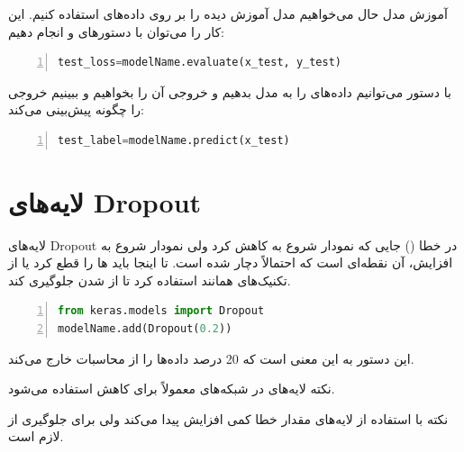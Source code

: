 \documentclass[10pt,xcolor=dvipsnames,professionalfont]{beamer}
\begin{document}
\begin{frame}[fragile]{آموزش مدل}
حال می‌خواهیم مدل آموزش دیده را بر روی داده‌های  استفاده کنیم. این کار را می‌توان با دستورهای  و  انجام دهیم:
\begin{latin}
\begin{lstlisting}[language=Python,frame=single,rulecolor=\color{magenta},numbers=left,numberstyle=\tiny]
test_loss=modelName.evaluate(x_test, y_test)
\end{lstlisting}
\end{latin}
با دستور  می‌توانیم داده‌های  را به مدل بدهیم و خروجی آن را بخواهیم و ببینیم خروجی را چگونه پیش‌بینی می‌کند:
\begin{latin}
\begin{lstlisting}[language=Python,frame=single,rulecolor=\color{magenta},numbers=left,numberstyle=\tiny]
test_label=modelName.predict(x_test)
\end{lstlisting}
\end{latin}
\end{frame}


\section{لایه‌های Dropout}
\begin{frame}[fragile]{لایه‌های Dropout}
در خطا () جایی که نمودار  شروع به کاهش کرد ولی نمودار  شروع به افزایش، آن نقطه‌ای است که احتمالاً دچار  شده است. تا اینجا باید ها را قطع کرد یا از تکنیک‌های همانند  استفاده کرد تا از  شدن جلوگیری کند.
\begin{latin}
\begin{lstlisting}[language=Python,frame=single,rulecolor=\color{magenta},numbers=left,numberstyle=\tiny]
from keras.models import Dropout
modelName.add(Dropout(0.2))
\end{lstlisting}
\end{latin}
این دستور به این معنی است که 20 درصد داده‌ها را از محاسبات خارج می‌کند.
\begin{block}{نکته}
لایه‌های  در شبکه‌های  معمولاً برای کاهش  استفاده می‌شود.
\end{block}

\begin{block}{نکته}
با استفاده از لایه‌های  مقدار خطا کمی افزایش پیدا می‌کند ولی برای جلوگیری از  لازم است.
\end{block}

\end{frame}
\end{document}
